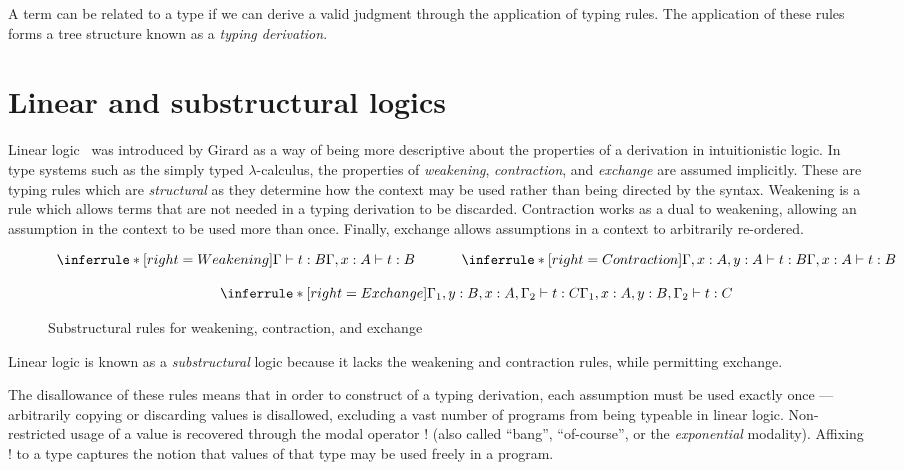 A term can be related to a type if we can derive a valid judgment through the
application of typing rules. The application of these rules forms a tree
structure known as a \textit{typing derivation}.


\section{Linear and substructural logics}
Linear logic~\cite{} was introduced by Girard as a way of being more descriptive
about the properties of a derivation in intuitionistic logic. In type systems
such as the simply typed $\lambda$-calculus, the properties of
\textit{weakening}, \textit{contraction}, and \textit{exchange} are assumed
implicitly. These are typing rules which are \textit{structural} as they
determine how the context may be used rather than being directed by the syntax.
Weakening is a rule which allows terms that are not needed in a typing
derivation to be discarded. Contraction works as a dual to weakening, allowing
an assumption in the context to be used more than once. Finally, exchange allows
assumptions in a context to arbitrarily re-ordered.


\begin{figure}[H]
  \begin{align*}
  \begin{array}{c}
    \inferrule*[right=Weakening]{\Gamma \vdash t : B}{\Gamma, x : A \vdash t : B}
    \;\;\;\;
    \;\;\;\;
    \;\;\;\;
    \inferrule*[right=Contraction]{\Gamma, x : A, y : A \vdash t : B}{\Gamma, x : A \vdash t : B}
    \\\\
    \inferrule*[right=Exchange]{\Gamma_{1}, y : B, x : A, \Gamma_{2} \vdash t : C} {\Gamma_{1}, x : A, y : B, \Gamma_{2} \vdash t : C}
    \end{array}
  \end{align*}
  \caption{Substructural rules for weakening, contraction, and exchange}
\end{figure}

Linear logic is known as a \textit{substructural} logic because it lacks the weakening
and contraction rules, while permitting exchange.

The disallowance of these rules means that in order to construct of a typing
derivation, each assumption must be used exactly once --- arbitrarily copying or
discarding values is disallowed, excluding a vast number of programs from being
typeable in linear logic. Non-restricted usage of a value is recovered through
the modal operator $!$ (also called ``bang'', ``of-course'', or the
\textit{exponential} modality). Affixing $!$ to a type captures the notion that
values of that type may be used freely in a program.

